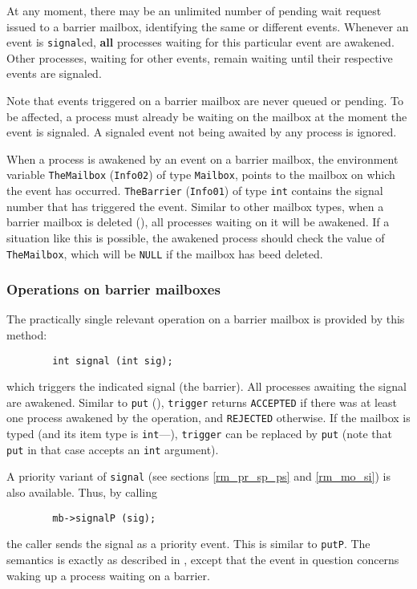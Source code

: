 At any moment, there may be an unlimited number of pending wait request
issued to a barrier mailbox, identifying the same or different events.
Whenever an event is {\tt signal}ed, {\bf all} processes waiting for this
particular event are awakened.
Other processes, waiting for other events, remain waiting until their
respective events are signaled.

Note that events triggered on a barrier mailbox are never queued or pending.
To be affected, a process must already be waiting on the mailbox at the moment
the event is signaled.
A signaled event not being awaited by any process is ignored.

When a process is awakened by an event on a barrier mailbox, the environment
variable {\tt TheMailbox} ({\tt Info02})
of type {\tt Mailbox}, points to the mailbox on which the event has occurred.
{\tt TheBarrier} ({\tt Info01}) of type {\tt int} contains the signal number
that has triggered the event.
Similar to other mailbox types, when a barrier mailbox is deleted
(), all processes waiting on it will be awakened.
If a situation like this is possible, the awakened
process should check the value of {\tt TheMailbox}, which will be {\tt NULL}
if the mailbox has beed deleted.

\subsubsection{Operations on barrier mailboxes}
\label{rm_mb_ba_op}

The practically single relevant operation on a barrier mailbox is provided by
this method:
\begin{verbatim}
        int signal (int sig);
\end{verbatim}
which triggers the indicated signal (the barrier).
All processes awaiting the signal are awakened.
Similar to {\tt put} (), {\tt trigger} returns
{\tt ACCEPTED} if there was at least one process awakened by the operation,
and {\tt REJECTED} otherwise.
If the mailbox is typed (and its item type is {\tt int}---),
{\tt trigger} can be
replaced by {\tt put} (note that {\tt put} in that case
accepts an {\tt int} argument).

A priority variant of {\tt signal} (see sections \ref{rm_pr_sp_ps} and
\ref{rm_mo_si}) is also available.
Thus, by calling
\begin{verbatim}
        mb->signalP (sig);
\end{verbatim}
the caller sends the signal as a priority event.
This is similar to {\tt putP}.
The semantics is exactly as described in , except that the
event in question concerns waking up a process waiting on a barrier.

